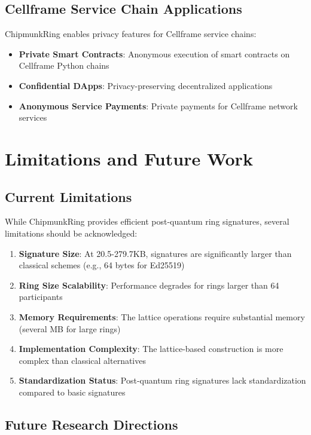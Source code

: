 \documentclass[11pt,a4paper]{article}
\begin{document}
\subsection{Cellframe Service Chain Applications}

ChipmunkRing enables privacy features for Cellframe service chains:
\begin{itemize}
\item \textbf{Private Smart Contracts}: Anonymous execution of smart contracts on Cellframe Python chains
\item \textbf{Confidential DApps}: Privacy-preserving decentralized applications
\item \textbf{Anonymous Service Payments}: Private payments for Cellframe network services
\end{itemize}

\section{Limitations and Future Work}

\subsection{Current Limitations}

While ChipmunkRing provides efficient post-quantum ring signatures, several limitations should be acknowledged:

\begin{enumerate}
\item \textbf{Signature Size}: At 20.5-279.7KB, signatures are significantly larger than classical schemes (e.g., 64 bytes for Ed25519)
\item \textbf{Ring Size Scalability}: Performance degrades for rings larger than 64 participants
\item \textbf{Memory Requirements}: The lattice operations require substantial memory (several MB for large rings)
\item \textbf{Implementation Complexity}: The lattice-based construction is more complex than classical alternatives
\item \textbf{Standardization Status}: Post-quantum ring signatures lack standardization compared to basic signatures
\end{enumerate}

\subsection{Future Research Directions}
\end{document}
